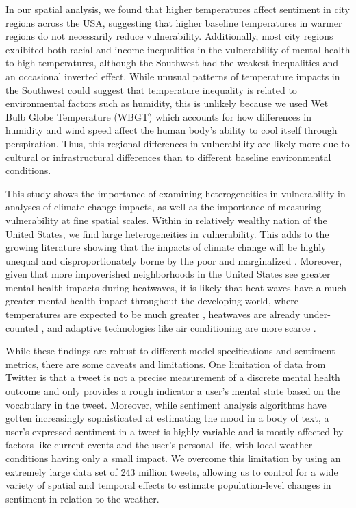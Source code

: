 \documentclass[fleqn,10pt]{wlscirep}
\begin{document}
In our spatial analysis, we found that higher temperatures affect sentiment in city regions across the USA, suggesting that higher baseline temperatures in warmer regions do not necessarily reduce vulnerability. Additionally, most city regions exhibited both racial and income inequalities in the vulnerability of mental health to high temperatures, although the Southwest had the weakest inequalities and an occasional inverted effect.  While unusual patterns of temperature impacts in the Southwest could suggest that temperature inequality is related to environmental factors such as humidity, this is unlikely because we used Wet Bulb Globe Temperature (WBGT) which accounts for how differences in humidity and wind speed affect the human body's ability to cool itself through perspiration. Thus, this regional differences in vulnerability are likely more due to cultural or infrastructural differences than to different baseline environmental conditions.

This study shows the importance of examining heterogeneities in vulnerability in analyses of climate change impacts, as well as the importance of measuring vulnerability at fine spatial scales.  Within in relatively wealthy nation of the United States, we find large heterogeneities in vulnerability.  This adds to the growing literature showing that the impacts of climate change will be highly unequal and disproportionately borne by the poor and marginalized \cite{Thomas2019Mar}.  Moreover, given that more impoverished neighborhoods in the United States see greater mental health impacts during heatwaves, it is likely that heat waves have a much greater mental health impact throughout the developing world, where temperatures are expected to be much greater \cite{Raymond2020May}, heatwaves are already under-counted \cite{Harrington2020Sep}, and adaptive technologies like air conditioning are more scarce \cite{Biardeau2020Jan}.

While these findings are robust to different model specifications and sentiment metrics, there are some caveats and limitations. One limitation of data from Twitter is that a tweet is not a precise measurement of a discrete mental health outcome and only provides a rough indicator a user's mental state based on the vocabulary in the tweet.  Moreover, while sentiment analysis algorithms have gotten increasingly sophisticated at estimating the mood in a body of text, a user's expressed sentiment in a tweet is highly variable and is mostly affected by factors like current events and the user's personal life, with local weather conditions having only a small impact.  We overcome this limitation by using an extremely large data set of 243 million tweets, allowing us to control for a wide variety of spatial and temporal effects to estimate population-level changes in sentiment in relation to the weather.
\end{document}
